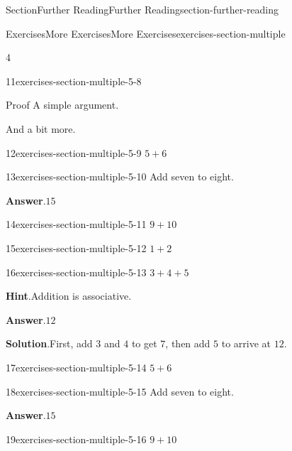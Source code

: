 \documentclass[twoside,10pt,]{article}
\newcommand{\blocktitlefont}{\relax}
\numberwithin{equation}{section}
\begin{document}
\begin{sectionptx}{Section}{Further Reading}{}{Further Reading}{}{}{section-further-reading}
\begin{exercises-subsection}{Exercises}{More Exercises}{}{More Exercises}{}{}{exercises-section-multiple}
\begin{exercisegroupcol}{4}
\begin{divisionexerciseegcol}{11}{}{}{exercises-section-multiple-5-8}
\begin{solutionproof}{Proof}
A simple argument.%
\end{solutionproof}
And a bit more.%
\end{divisionexerciseegcol}%
\begin{divisionexerciseegcol}{12}{}{}{exercises-section-multiple-5-9}%
\(5+6\)%
\end{divisionexerciseegcol}%
\begin{divisionexerciseegcol}{13}{}{}{exercises-section-multiple-5-10}%
Add seven to eight.%
\par\smallskip%
\noindent\textbf{\blocktitlefont Answer}.\hypertarget{exercises-section-multiple-5-10-2}{}\quad{}\(15\)%
\end{divisionexerciseegcol}%
\begin{divisionexerciseegcol}{14}{}{}{exercises-section-multiple-5-11}%
\(9+10\)%
\end{divisionexerciseegcol}%
\begin{divisionexerciseegcol}{15}{}{}{exercises-section-multiple-5-12}%
\(1+2\)%
\end{divisionexerciseegcol}%
\begin{divisionexerciseegcol}{16}{}{}{exercises-section-multiple-5-13}%
\(3+4+5\)%
\par\smallskip%
\noindent\textbf{\blocktitlefont Hint}.\hypertarget{exercises-section-multiple-5-13-2}{}\quad{}Addition is associative.%
\par\smallskip%
\noindent\textbf{\blocktitlefont Answer}.\hypertarget{exercises-section-multiple-5-13-3}{}\quad{}\(12\)%
\par\smallskip%
\noindent\textbf{\blocktitlefont Solution}.\hypertarget{exercises-section-multiple-5-13-4}{}\quad{}First, add \(3\) and \(4\) to get \(7\), then add \(5\) to arrive at \(12\).%
\end{divisionexerciseegcol}%
\begin{divisionexerciseegcol}{17}{}{}{exercises-section-multiple-5-14}%
\(5+6\)%
\end{divisionexerciseegcol}%
\begin{divisionexerciseegcol}{18}{}{}{exercises-section-multiple-5-15}%
Add seven to eight.%
\par\smallskip%
\noindent\textbf{\blocktitlefont Answer}.\hypertarget{exercises-section-multiple-5-15-2}{}\quad{}\(15\)%
\end{divisionexerciseegcol}%
\begin{divisionexerciseegcol}{19}{}{}{exercises-section-multiple-5-16}%
\(9+10\)%
\end{divisionexerciseegcol}%

\end{exercisegroupcol}
\end{exercises-subsection}
\end{sectionptx}
\end{document}

